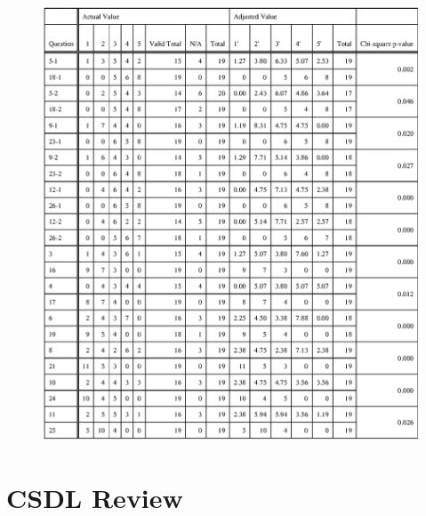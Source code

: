 \begin{figure}[htbp]
  \centering
  \includegraphics{images/appndx-2-2.eps}
  \label{appndx-2-2}
\end{figure}

\chapter{CSDL Review}
\label{appndx:csdl}

